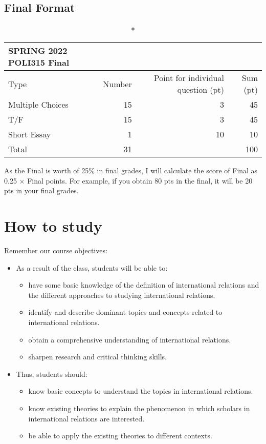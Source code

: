 \documentclass[
]{book}
\begin{document}
\hypertarget{final-format}{%
\subsection*{Final Format}\label{final-format}}

\captionsetup[table]{labelformat=empty,skip=1pt}
\begin{longtable}{lrrr}
\caption*{
{\large SPRING 2022 POLI315 Final}
} \\ 
\toprule
Type & Number & Point for individual question (pt) & Sum (pt) \\ 
\midrule
Multiple Choices & 15 & 3 & 45 \\ 
T/F & 15 & 3 & 45 \\ 
Short Essay & 1 & 10 & 10 \\ 
Total & 31 &  & 100 \\ 
\bottomrule
\end{longtable}

As the Final is worth of 25\% in final grades, I will calculate the score of Final as 0.25 \(\times\) Final points. For example, if you obtain 80 pts in the final, it will be 20 pts in your final grades.

\hypertarget{how-to-study}{%
\section*{How to study}\label{how-to-study}}

Remember our course objectives:

\begin{itemize}
\item
  As a result of the class, students will be able to:

  \begin{itemize}
  \item
    have some basic knowledge of the definition of international relations and the different approaches to studying international relations.
  \item
    identify and describe dominant topics and concepts related to international relations.
  \item
    obtain a comprehensive understanding of international relations.
  \item
    sharpen research and critical thinking skills.
  \end{itemize}
\item
  Thus, students should:

  \begin{itemize}
  \item
    know basic concepts to understand the topics in international relations.
  \item
    know existing theories to explain the phenomenon in which scholars in international relations are interested.
  \item
    be able to apply the existing theories to different contexts.
  \end{itemize}
\end{itemize}
\end{document}
